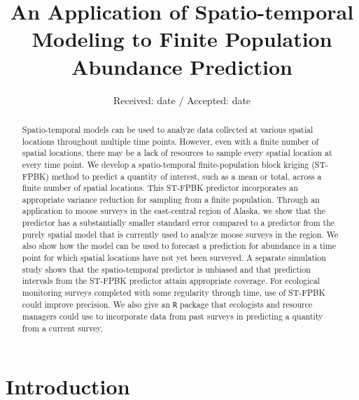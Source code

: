 \documentclass[]{article}    %
\begin{document}
\title{An Application of Spatio-temporal Modeling to Finite Population
Abundance Prediction }




\date{Received: date / Accepted: date}


\maketitle

\begin{abstract}
Spatio-temporal models can be used to analyze data collected at various
spatial locations throughout multiple time points. However, even with a
finite number of spatial locations, there may be a lack of resources to
sample every spatial location at every time point. We develop a
spatio-temporal finite-population block kriging (ST-FPBK) method to
predict a quantity of interest, such as a mean or total, across a finite
number of spatial locations. This ST-FPBK predictor incorporates an
appropriate variance reduction for sampling from a finite population.
Through an application to moose surveys in the east-central region of
Alaska, we show that the predictor has a substantially smaller standard
error compared to a predictor from the purely spatial model that is
currently used to analyze moose surveys in the region. We also show how
the model can be used to forecast a prediction for abundance in a time
point for which spatial locations have not yet been surveyed. A separate
simulation study shows that the spatio-temporal predictor is unbiased
and that prediction intervals from the ST-FPBK predictor attain
appropriate coverage. For ecological monitoring surveys completed with
some regularity through time, use of ST-FPBK could improve precision. We
also give an \texttt{R} package that ecologists and resource managers
could use to incorporate data from past surveys in predicting a quantity
from a current survey.
\\


\end{abstract}


\def\spacingset#1{\renewcommand{\baselinestretch}%
{#1}\small\normalsize} \spacingset{1}


\hypertarget{intro}{%
\section{Introduction}\label{intro}}
\end{document}
